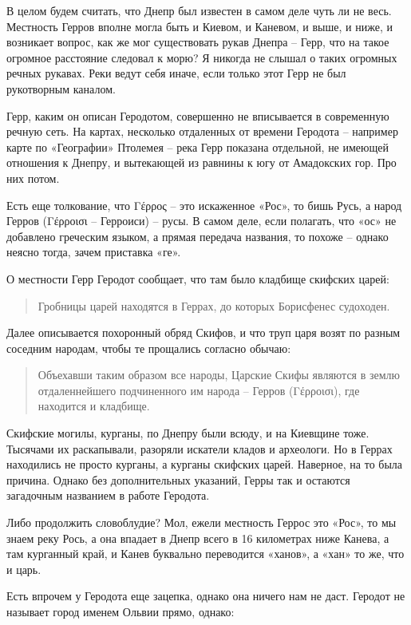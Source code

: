 В целом будем считать, что Днепр был известен в самом деле чуть ли не весь. Местность Герров вполне могла быть и Киевом, и Каневом, и выше, и ниже, и возникает вопрос, как же мог существовать рукав Днепра – Герр, что на такое огромное расстояние следовал к морю? Я никогда не слышал о таких огромных речных рукавах. Реки ведут себя иначе, если только этот Герр не был рукотворным каналом. 

Герр, каким он описан Геродотом, совершенно не вписывается в современную речную сеть. На картах, несколько отдаленных от времени Геродота – например карте по «Географии» Птолемея – река Герр показана отдельной, не имеющей отношения к Днепру, и вытекающей из равнины к югу от Амадокских гор. Про них потом.

Есть еще толкование, что Γέρρος – это искаженное «Рос», то бишь Русь, а народ Герров (Γέρροισι – Герроиси) – русы. В самом деле, если полагать, что «ос» не добавлено греческим языком, а прямая передача названия, то похоже – однако неясно тогда, зачем приставка «ге».

О местности Герр Геродот сообщает, что там было кладбище скифских царей:

\begin{quotation}
Гробницы царей находятся в Геррах, до которых Борисфенес судоходен.
\end{quotation}

Далее описывается похоронный обряд Скифов, и что труп царя возят по разным соседним народам, чтобы те прощались согласно обычаю:

\begin{quotation}
Объехавши таким образом все народы, Царские Скифы являются в землю отдаленнейшего подчиненного им народа – Герров (Γέρροισι), где находится и кладбище.
\end{quotation}

Скифские могилы, курганы, по Днепру были всюду, и на Киевщине тоже. Тысячами их раскапывали, разоряли искатели кладов и археологи. Но в Геррах находились не просто курганы, а курганы скифских царей. Наверное, на то была причина. Однако без дополнительных указаний, Герры так и остаются загадочным названием в работе Геродота.

Либо продолжить словоблудие? Мол, ежели местность Геррос это «Рос», то мы знаем реку Рось, а она впадает в Днепр всего в 16 километрах ниже Канева, а там курганный край, и Канев буквально переводится «ханов», а «хан» то же, что и царь. 

Есть впрочем у Геродота еще зацепка, однако она ничего нам не даст. Геродот не называет город именем Ольвии прямо, однако:

